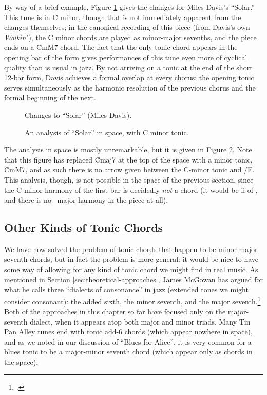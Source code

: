 By way of a brief example, Figure \ref{tfe:solar-changes} gives the changes
for Miles Davis's ``Solar.'' This tune is in C minor, though that is not
immediately apparent from the changes themselves; in the canonical recording
of this piece (from Davis's own \emph{Walkin'}\,), the C minor chords are
played as minor-major sevenths, and the piece ends on a \h{CmM7}
chord.\nocite{davis:walkin} The fact that the only tonic chord appears in the
opening bar of the form gives performances of this tune even more of cyclical
quality than is usual in jazz. By not arriving on a tonic at the end of the
short 12-bar form, Davis achieves a formal overlap at every chorus: the
opening tonic serves simultaneously as the harmonic resolution of the previous
chorus and the formal beginning of the next.

\begin{figure}[tbp]
  \caption{Changes to ``Solar'' (Miles Davis).}
  \label{tfe:solar-changes}
\end{figure}

\begin{figure}[tb]
  \caption{An analysis of ``Solar'' in \tf space, with C minor tonic.}
  \label{tfe:solar-space}
\end{figure}

The analysis in \tf space is mostly unremarkable, but it is given in Figure
\ref{tfe:solar-space}. Note that this figure has replaced \h{Cmaj7} at the top
of the space with a minor tonic, \h{CmM7}, and as such there is no arrow given
between the C-minor tonic and \V/F. This analysis, though, is not
possible in the \tf space of the previous section, since the C-minor harmony
of the first bar is decidedly \emph{not} a \ii chord (it would be ii of
\Bflat, and there is no \Bflat\ major harmony in the piece at all).



\FloatBarrier
\subsection{Other Kinds of Tonic Chords}
\label{sec:other-kinds-tonic}

We have now solved the problem of tonic chords that happen to be minor-major
seventh chords, but in fact the problem is more general: it would be nice to
have some way of allowing for any kind of tonic chord we might find in real
music. As mentioned in Section \ref{sec:theoretical-approaches}, James McGowan
has argued for what he calls three ``dialects of consonance'' in jazz
(extended tones we might consider consonant): the added sixth, the minor
seventh, and the major seventh.\footcite[76--79]{mcgowan:2005} Both of the
approaches in this chapter so far have focused only on the major-seventh
dialect, when it appears atop both major and minor triads. Many Tin Pan Alley
tunes end with tonic add-6 chords (which appear nowhere in \tf space), and as
we noted in our discussion of ``Blues for Alice'', it is very common for a
blues tonic to be a major-minor seventh chord (which appear only as \V chords
in the space).

